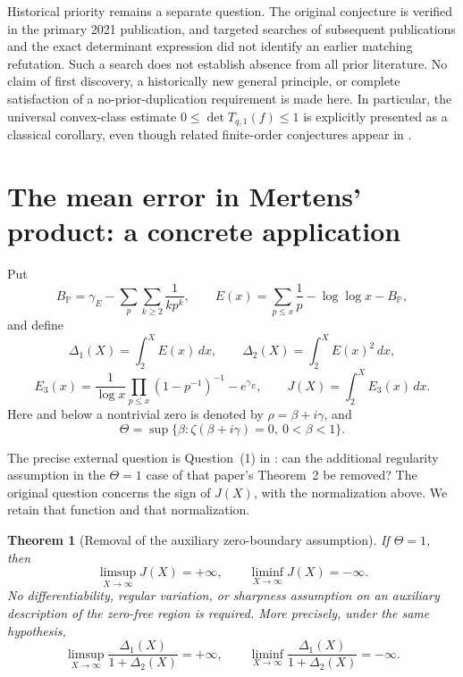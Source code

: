 \documentclass[11pt,a4paper]{article}
\numberwithin{equation}{section}
\newtheorem{theorem}{Theorem}[section]
\theoremstyle{definition}\newtheorem{definition}[theorem]{Definition}
\theoremstyle{remark}\newtheorem{remark}[theorem]{Remark}
\begin{document}
Historical priority remains a separate question.  The original
conjecture is verified in the primary 2021 publication, and targeted
searches of subsequent publications and the exact determinant
expression did not identify an earlier matching refutation.  Such
a search does not establish absence from all prior literature.
No claim of first discovery, a historically new general principle,
or complete satisfaction of a no-prior-duplication requirement is
made here.  In particular, the universal convex-class estimate
$0\leq\det T_{q,1}(f)\leq1$ is explicitly presented as a classical
corollary, even though related finite-order conjectures appear in
\cite{Cudna2020,LeckoSimSmiarowska2020}.



\section{The mean error in Mertens' product: a concrete application}
\label{sec:zhao-application}

Put
\[
 B_{\mathbb P}=\gamma_E-
 \sum_p\sum_{k\geq2}\frac{1}{kp^k},\qquad
 E(x)=\sum_{p\leq x}\frac1p-\log\log x-B_{\mathbb P},
\]
and define
\[
 \Delta_1(X)=\int_2^X E(x)\,dx,\qquad
 \Delta_2(X)=\int_2^X E(x)^2\,dx,
\]
\[
 E_3(x)=\frac{1}{\log x}
          \prod_{p\leq x}(1-p^{-1})^{-1}-e^{\gamma_E},
 \qquad J(X)=\int_2^X E_3(x)\,dx.
\]
Here and below a nontrivial zero is denoted by
$\rho=\beta+i\gamma$, and
\[
 \Theta=\sup\{\beta:\zeta(\beta+i\gamma)=0,
                              \ 0<\beta<1\}.
\]

The precise external question is Question~(1) in
\cite[Section~8]{Zhao2025}: can the additional regularity assumption
in the $\Theta=1$ case of that paper's Theorem~2 be removed?
The original question concerns the sign of $J(X)$, with the normalization
above. We retain that function and that normalization.

\begin{theorem}[Removal of the auxiliary zero-boundary assumption]
\label{thm:zhao-removal}
If $\Theta=1$, then
\[
 \limsup_{X\to\infty}J(X)=+\infty,
 \qquad
 \liminf_{X\to\infty}J(X)=-\infty.
\]
No differentiability, regular variation, or sharpness assumption on an
auxiliary description of the zero-free region is required.
More precisely, under the same hypothesis,
\begin{equation}
 \label{eq:zhao-moment-domination}
 \limsup_{X\to\infty}
       \frac{\Delta_1(X)}{1+\Delta_2(X)}=+\infty,
 \qquad
 \liminf_{X\to\infty}
       \frac{\Delta_1(X)}{1+\Delta_2(X)}=-\infty.
\end{equation}
\end{theorem}
\end{document}
